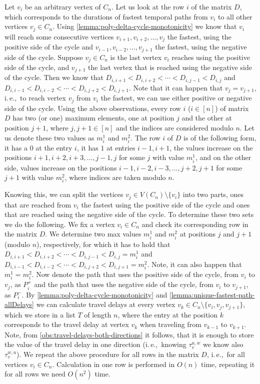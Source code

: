 \documentclass[a4paper,UKenglish,cleveref, autoref, thm-restate]{lipics-v2021}
\newcommand{\ie}{i.\,e.,\ }
\begin{document}
Let $v_i$ be an arbitrary vertex of $C_n$. Let us look at the row $i$ of the matrix $D$, which corresponds to the durations of fastest temporal paths from $v_i$ to all other vertices $v_j \in C_n$.
Using \cref{lemma:poly-delta-cycle-monotonicity} we know that $v_i$ will reach some consecutive vertices $v_{i+1}, v_{i+2}, \dots, v_j$ the fastest, using the positive side of the cycle 
and $v_{i-1}, v_{i-2}, \dots, v_{j+1}$ the fastest, using the negative side of the cycle.
Suppose $v_j \in C_n$ is the last vertex $v_i$ reaches using the positive side of the cycle, and $v_{j+1}$ the last vertex that is reached using the negative side of the cycle.
Then we know that $D_{i,i+1} < D_{i,i+2} < \cdots< D_{i,j-1} < D_{i,j}$ and 
$D_{i,i-1} < D_{i,i-2} < \cdots < D_{i,j+2} < D_{i,j+1}$.
Note that it can happen that $v_j = v_{j+1}$, \ie to reach vertex $v_j$ from $v_i$ the fastest, we can use either positive or negative side of the cycle.
Using the above observations, every row $i$ ($i \in [n]$) of matrix $D$ has two (or one) maximum elements, one at position $j$ and the other at position $j+1$, where $j, j+1 \in [n]$ and the indices are considered modulo $n$.
Let us denote these two values as $m_i^1$ and $m_i^2$.
The row $i$ of $D$ is of the following form, it has a $0$ at the entry $i$, it has $1$ at entries $i-1, i+1$,
the values increase on the positions $i+1, i+2, i+3, \dots, j-1, j$ for some $j$ with value $m_i^1$, 
and on the other side, values increase on the positions $i-1, i-2, i-3, \dots, j+2, j+1$ for some $j+1$ with value $m_i^2$,
where indices are taken modulo $n$.

Knowing this, we can split the vertices $v_j \in V(C_n) \setminus \{v_i\}$ into two parts, ones that are reached from $v_i$ the fastest using the positive side of the cycle and ones that are reached using the negative side of the cycle.
To determine these two sets we do the following.
We fix a vertex $v_i \in C_n$ and check its corresponding row in the matrix $D$. 
We determine two max values $m_i^1$ and $m_i^2$ at positions $j$ and $j+1$ (modulo $n$), respectively,
for which it has to hold that
$D_{i,i+1} < D_{i,i+2} < \cdots< D_{i,j-1} < D_{i,j}=m_i^1$ and 
$D_{i,i-1} < D_{i,i-2} < \cdots < D_{i,j+2} < D_{i,j+1}=m_i^2$.
Note, it can also happen that $m_i^1 = m_i^2$. 
Now denote the path that uses the positive side of the cycle, from $v_i$ to $v_j$, as $P^+_i$ and
the path that uses the negative side of the cycle, from $v_i$ to $v_{j+1}$, as $P^-_i$.
By \cref{lemma:poly-delta-cycle-monotonicity} and \cref{lemma:unique-fastest-path-allDelays} we can calculate travel delays at every vertex $v_k \in C_n \setminus \{v_i, v_j, v_{j+1}\}$,
which we store in a list $T$ of length $n$,
where the entry at the position $k$ corresponds to the travel delay at vertex $v_k$ when traveling from $v_{k-1}$ to $v_{k+1}$.
Note, from \cref{obs:travel-delays-both-directions} it follows, that it is enough to store the value of the travel delay in one direction (\ie knowing $\tau_v^{u,w}$ we know also $\tau_v^{w,u}$).
We repeat the above procedure for all rows in the matrix $D$, \ie for all vertices $v_i \in C_n$.
Calculation in one row is performed in $O(n)$ time, repeating it for all rows we need $O(n^2)$ time.
\end{document}
